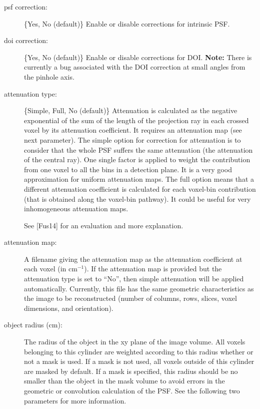 \documentclass{article}
\begin{document}
{{\begin{description}
\item[psf correction:] \{Yes, No (default)\} Enable or disable corrections for intrinsic PSF.

\item[doi correction:] \{Yes, No (default)\} Enable or disable corrections for DOI. \textbf{Note:} There is currently a bug associated with the DOI correction at small angles from the pinhole axis.

\item[attenuation type:] \{Simple, Full, No (default)\} Attenuation is calculated as the negative exponential of the sum of the length of the projection ray in each crossed voxel by its attenuation coefficient. It requires an attenuation map (see next parameter). The simple option for correction for attenuation is to consider that the whole PSF suffers the same attenuation (the attenuation of the central ray). One single factor is applied to weight the contribution from one voxel to all the bins in a detection plane. It is a very good approximation for uniform attenuation maps. The full option means that a different attenuation coefficient is calculated for each voxel-bin contribution (that is obtained along the voxel-bin pathway). It could be useful for very inhomogeneous attenuation maps.

See [Fus14] for an evaluation and more explanation.

\item[attenuation map:] A filename giving the attenuation map as the attenuation coefficient at each voxel (in $\mathrm{cm}^{-1}$). If the attenuation map is provided but the attenuation type is set to ``No'', then simple attenuation will be applied automatically. Currently, this file has the same geometric characteristics as the image to be reconstructed (number of columns, rows, slices, voxel dimensions, and orientation).

\item[object radius (cm):] The radius of the object in the xy plane of the image volume. All voxels belonging to this cylinder are weighted according to this radius whether or not a mask is used. If a mask is not used, all voxels outside of this cylinder are masked by default. If a mask is specified, this radius should be no smaller than the object in the mask volume to avoid errors in the geometric or convolution calculation of the PSF. See the following two parameters for more information.




\end{description}}}
\end{document}
